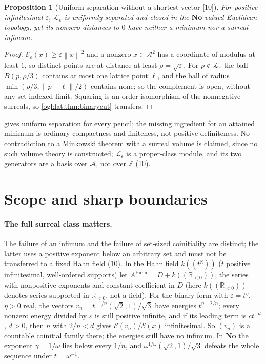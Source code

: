 \documentclass[11pt,oneside]{article}
\numberwithin{equation}{section}
\newtheorem{proposition}[proposition]{Proposition}
\theoremstyle{definition}
\theoremstyle{remark}
\newcommand{\No}{\mathbf{No}}
\newcommand{\Z}{\mathbb Z}
\newcommand{\R}{\mathbb R}
\newcommand{\A}{\mathcal A}
\newcommand{\cE}{\mathcal E}
\newcommand{\norm}[1]{\left\lVert #1\right\rVert}
\newcommand{\src}[1]{\textup{\textsf{\small[#1]}}}
\begin{document}
\begin{proposition}[Uniform separation without a shortest vector \src{10}]\label{ogl:lat:prop:closed}
For positive infinitesimal $\varepsilon$, $\mathcal L_\varepsilon$ is uniformly
separated and closed in the $\No$-valued Euclidean topology, yet its nonzero
distances to $0$ have neither a minimum nor a surreal infimum.
\end{proposition}
\begin{proof}
$\cE_\varepsilon(x)\ge\varepsilon\norm{x}^2$ and a nonzero $x\in\A^2$ has a
coordinate of modulus at least $1$, so distinct points are at distance at least
$\rho=\sqrt\varepsilon$. For $p\notin\mathcal L_\varepsilon$ the ball
$B(p,\rho/3)$ contains at most one lattice point $\ell$, and the ball of radius
$\min(\rho/3,\norm{p-\ell}/2)$ contains none; so the complement is open, without
any set-indexed limit. Squaring is an order isomorphism of the nonnegative
surreals, so \cref{ogl:lat:thm:binarycut} transfers.
\end{proof}

 gives uniform separation for every pencil; the
missing ingredient for an attained minimum is ordinary compactness and
finiteness, not positive definiteness. No contradiction to a Minkowski theorem
with a surreal volume is claimed, since no such volume theory is constructed;
$\mathcal L_\varepsilon$ is a proper-class module, and its two generators are a
basis over $\A$, not over $\Z$ (10).

\section{Scope and sharp boundaries}\label{ogl:lat:sec:scope}

\paragraph{The full surreal class matters.} The failure of an infimum and the
failure of set-sized coinitiality are distinct; the latter uses a positive
exponent below an arbitrary set and must not be transferred to a fixed Hahn field
(10). In the Hahn field $k((t^\R))$ ($t$ positive infinitesimal, well-ordered
supports) let $A^{\mathrm{Hahn}}=D+k((\R_{<0}))$, the series with nonpositive
exponents and constant coefficient in $D$ (here $k((\R_{<0}))$ denotes series
supported in $\R_{<0}$, not a field). For the binary form with
$\varepsilon=t^\eta$, $\eta>0$ real, the vectors
$v_n=t^{-1/n}(\sqrt2,1)/\sqrt3$ have energies $t^{\eta-2/n}$; every nonzero energy
divided by $\varepsilon$ is still positive infinite, and if its leading term is
$ct^{-d}$, $d>0$, then $n$ with $2/n<d$ gives $\cE(v_n)/\cE(x)$ infinitesimal. So
$(v_n)$ is a countable coinitial family there; the energies still have no
infimum. In $\No$ the exponent $\gamma=1/\omega$ lies below every $1/n$, and
$\omega^{1/\omega}(\sqrt2,1)/\sqrt3$ defeats the whole sequence under $t=\omega^{-1}$.
\end{document}
